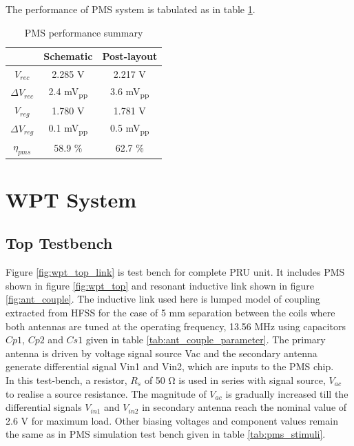 \documentclass[12pt,a4paper,UKenglish]{report}
\begin{document}
The performance of PMS system is tabulated as in table \ref{tab:pms_spec}.
\begin{table}[H]
\caption{PMS performance summary} 
\begin{center}
\begin{tabular}{c|c|c}
\hline \hline
			& \textbf{Schematic}	& \textbf{Post-layout} 	\\
\hline \hline
$V_{rec}$ 			& 2.285 \si{\volt}		& 2.217 V	\\ \hline
$\Delta V_{rec}$	& 2.4 \si{\milli\volt}\textsubscript{pp} & 3.6 \si{\milli\volt}\textsubscript{pp}		\\ \hline
$V_{reg}$			& 1.780	\si{\volt}		& 1.781 \si{\volt}			\\ \hline
$\Delta V_{reg}$ 	& 0.1 \si{\milli\volt}\textsubscript{pp} & 0.5 \si{\milli\volt}\textsubscript{pp}		\\ \hline
$\eta_{pms}$		& 	58.9  \%	& 62.7  \%		\\ 
 
\hline \hline
\end{tabular}
\end{center}
\label{tab:pms_spec}
\end{table}%

\section{WPT System} 
\subsection{Top Testbench} %

Figure \ref{fig:wpt_top_link} is test bench for complete PRU unit. It includes PMS shown in figure \ref{fig:wpt_top} and resonant inductive link shown in figure \ref{fig:ant_couple}. The inductive link used here is lumped model of coupling extracted from HFSS for the case of 5 mm separation between the coils where both antennas are tuned at the operating frequency, 13.56 MHz using capacitors $Cp1$, $Cp2$ and $Cs1$ given in table \ref{tab:ant_couple_parameter}. The primary antenna is driven by voltage signal source Vac and the secondary antenna generate differential signal Vin1 and Vin2, which are inputs to the PMS chip. \\

In this test-bench, a resistor, $R_{s}$ of  50 \si{\ohm} is used in series with signal source, $V_{ac}$ to realise a 
source resistance. The magnitude of $V_{ac}$ is gradually increased till the differential signals $V_{in1}$ and $V_{in2}$ 
in secondary antenna reach the nominal value of 2.6 \si{\volt} for maximum load. Other biasing voltages and component 
values remain the same as in PMS simulation test bench given in table \ref{tab:pms_stimuli}. \\
\end{document}
